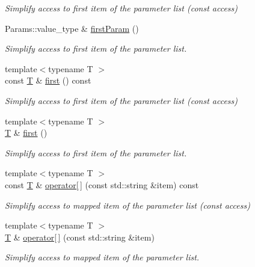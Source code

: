 \begin{DoxyCompactItemize}
\begin{DoxyCompactList}\small\item\em Simplify access to first item of the parameter list (const access) \end{DoxyCompactList}\item 
Params\+::value\+\_\+type \& \hyperlink{class_d_d4hep_1_1_conditions_1_1_abstract_map_acedd8446b04dc419fd9f73611f01b2ef}{first\+Param} ()
\begin{DoxyCompactList}\small\item\em Simplify access to first item of the parameter list. \end{DoxyCompactList}\item 
{\footnotesize template$<$typename T $>$ }\\const \hyperlink{class_t}{T} \& \hyperlink{class_d_d4hep_1_1_conditions_1_1_abstract_map_aa07e99193c515602fccec5864f2c12bc}{first} () const
\begin{DoxyCompactList}\small\item\em Simplify access to first item of the parameter list (const access) \end{DoxyCompactList}\item 
{\footnotesize template$<$typename T $>$ }\\\hyperlink{class_t}{T} \& \hyperlink{class_d_d4hep_1_1_conditions_1_1_abstract_map_a8f1ca773617130ea41d6f4406862d560}{first} ()
\begin{DoxyCompactList}\small\item\em Simplify access to first item of the parameter list. \end{DoxyCompactList}\item 
{\footnotesize template$<$typename T $>$ }\\const \hyperlink{class_t}{T} \& \hyperlink{class_d_d4hep_1_1_conditions_1_1_abstract_map_a2cbca03ad9ab72db2d441433e1261de0}{operator\mbox{[}$\,$\mbox{]}} (const std\+::string \&item) const
\begin{DoxyCompactList}\small\item\em Simplify access to mapped item of the parameter list (const access) \end{DoxyCompactList}\item 
{\footnotesize template$<$typename T $>$ }\\\hyperlink{class_t}{T} \& \hyperlink{class_d_d4hep_1_1_conditions_1_1_abstract_map_a29fc7ce5409ad6c0ec94b217225b3e78}{operator\mbox{[}$\,$\mbox{]}} (const std\+::string \&item)
\begin{DoxyCompactList}\small\item\em Simplify access to mapped item of the parameter list. \end{DoxyCompactList}\end{DoxyCompactItemize}
